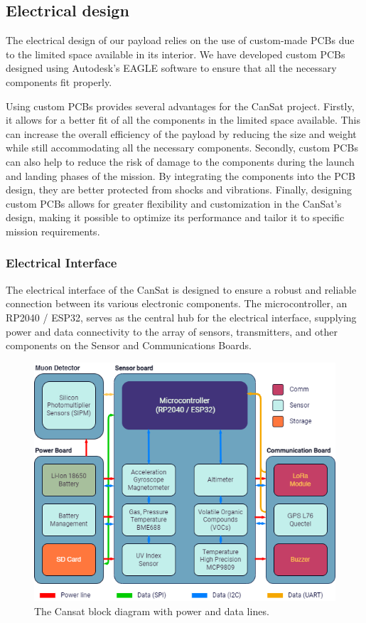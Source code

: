 


\subsection{Electrical design}

The electrical design of our payload relies on the use of custom-made PCBs due to the limited space available in its interior. We have developed custom PCBs designed using Autodesk's EAGLE software to ensure that all the necessary components fit properly. 

Using custom PCBs provides several advantages for the CanSat project. Firstly, it allows for a better fit of all the components in the limited space available. This can increase the overall efficiency of the payload by reducing the size and weight while still accommodating all the necessary components. Secondly, custom PCBs can also help to reduce the risk of damage to the components during the launch and landing phases of the mission. By integrating the components into the PCB design, they are better protected from shocks and vibrations. Finally, designing custom PCBs allows for greater flexibility and customization in the CanSat's design, making it possible to optimize its performance and tailor it to specific mission requirements.

\subsubsection{Electrical Interface}
The electrical interface of the CanSat is designed to ensure a robust and reliable connection between its various electronic components. The microcontroller, an RP2040 / ESP32, serves as the central hub for the electrical interface, supplying power and data connectivity to the array of sensors, transmitters, and other components on the Sensor and Communications Boards.

\begin{figure}[htbp]
\centering
\includegraphics[width=0.7\linewidth]{images/img_module_diagram_new.png}
\caption{\small{The Cansat block diagram with power and data lines.}}
\label{figmodule_diagrame}
\end{figure}

